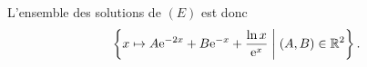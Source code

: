 \begin{description}
\begin{enumerate}
				L'ensemble des solutions de $(E)$ est donc
				\[
				\left\{
					x\mapsto A\mathrm{e}^{-2x}+B\mathrm{e}^{-x}+\frac{\ln x}{\mathrm{e}^{x}}
					\;\middle|\; (A,B)\in\mathbb{R}^2
				\right\}.
				\]
		\end{enumerate}
\end{description}























